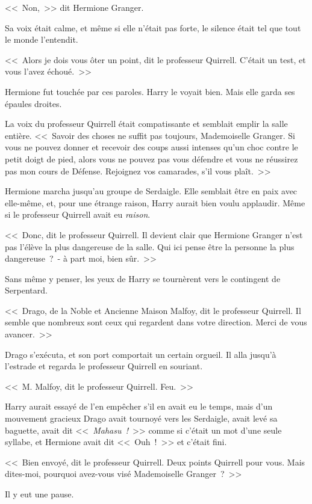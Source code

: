 <<~Non,~>> dit Hermione Granger.

Sa voix était calme, et même si elle n'était pas forte, le silence était tel que tout le monde l'entendit.

<<~Alors je dois vous ôter un point, dit le professeur Quirrell. C'était un test, et vous l'avez échoué.~>>

Hermione fut touchée par ces paroles. Harry le voyait bien. Mais elle garda ses épaules droites.

La voix du professeur Quirrell était compatissante et semblait emplir la salle entière. <<~Savoir des choses ne suffit pas toujours, Mademoiselle Granger. Si vous ne pouvez donner et recevoir des coups aussi intenses qu'un choc contre le petit doigt de pied, alors vous ne pouvez pas vous défendre et vous ne réussirez pas mon cours de Défense. Rejoignez vos camarades, s'il vous plaît.~>>

Hermione marcha jusqu'au groupe de Serdaigle. Elle semblait être en paix avec elle-même, et, pour une étrange raison, Harry aurait bien voulu applaudir. Même si le professeur Quirrell avait eu \emph{raison}.

<<~Donc, dit le professeur Quirrell. Il devient clair que Hermione Granger n'est pas l'élève la plus dangereuse de la salle. Qui ici pense être la personne la plus dangereuse~?~- à part moi, bien sûr.~>>

Sans même y penser, les yeux de Harry se tournèrent vers le contingent de Serpentard.

<<~Drago, de la Noble et Ancienne Maison Malfoy, dit le professeur Quirrell. Il semble que nombreux sont ceux qui regardent dans votre direction. Merci de vous avancer.~>>

Drago s'exécuta, et son port comportait un certain orgueil. Il alla jusqu'à l'estrade et regarda le professeur Quirrell en souriant.

<<~M. Malfoy, dit le professeur Quirrell. Feu.~>>

Harry aurait essayé de l'en empêcher s'il en avait eu le temps, mais d'un mouvement gracieux Drago avait tournoyé vers les Serdaigle, avait levé sa baguette, avait dit <<~\emph{Mahasu~!}~>> comme si c'était un mot d'une seule syllabe, et Hermione avait dit <<~Ouh~!~>> et c'était fini.

<<~Bien envoyé, dit le professeur Quirrell. Deux points Quirrell pour vous. Mais dites-moi, pourquoi avez-vous visé Mademoiselle Granger~?~>>

Il y eut une pause.

